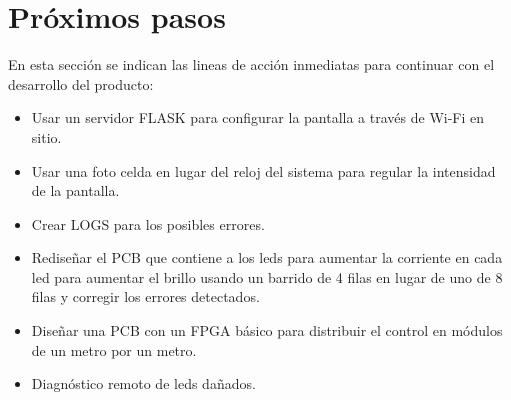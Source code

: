 \section{Próximos pasos}

En esta sección se indican las lineas de acción inmediatas para continuar con el desarrollo del producto:
\begin{itemize}
\item Usar un servidor FLASK para configurar la pantalla a través de Wi-Fi en sitio.
\item Usar una foto celda en lugar del reloj del sistema para regular la intensidad de la pantalla.
\item Crear LOGS para los posibles errores.
\item Rediseñar el PCB que contiene a los leds para aumentar la corriente en  cada led para aumentar el brillo usando un barrido de 4 filas en lugar de uno de 8 filas y corregir los errores detectados.
\item Diseñar una PCB con un FPGA básico para distribuir el control en módulos de un metro por un metro.
\item Diagnóstico remoto de leds dañados.
\end{itemize}
